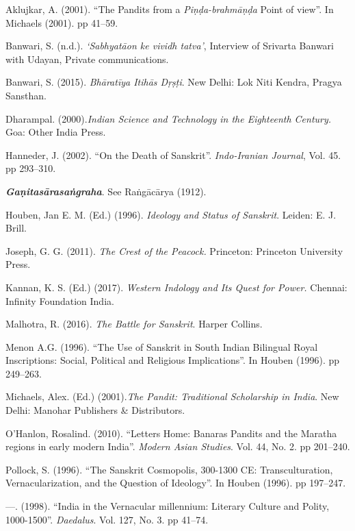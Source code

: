 \begin{thebibliography}{99}
\itemsep=1pt
 Aklujkar, A. (2001). “The Pandits from a \textit{Piṇḍa-brahmāṇḍa} Point of view”. In Michaels (2001). pp 41--59.

  Banwari, S. (n.d.). \textit{‘Sabhyatāon ke vividh tatva’}, Interview of Srivarta Banwari with Udayan, Private communications.

  Banwari, S. (2015). \textit{Bhāratīya Itihās Dṛṣṭi}. New Delhi: Lok Niti Kendra, Pragya Sansthan.

  Dharampal. (2000).\textit{Indian Science and Technology in the Eighteenth Century.} Goa: Other India Press.

  Hanneder, J. (2002). “On the Death of Sanskrit”. \textit{Indo-Iranian Journal}, Vol. 45. pp 293--310.
 
  \textbf{\textit{Gaṇitasārasaṅgraha}}. See Raṅgācārya (1912).

  Houben, Jan E. M. (Ed.) (1996). \textit{Ideology and Status of Sanskrit}. Leiden: E. J. Brill.

  Joseph, G. G. (2011). \textit{The Crest of the Peacock.} Princeton: Princeton University Press.

  Kannan, K. S. (Ed.) (2017). \textit{Western Indology and Its Quest for Power.} Chennai: Infinity Foundation India.

  Malhotra, R. (2016). \textit{The Battle for Sanskrit}. Harper Collins.

  Menon A.G. (1996). “The Use of Sanskrit in South Indian Bilingual Royal Inscriptions: Social, Political and Religious Implications”. In Houben (1996). pp 249--263.

  Michaels, Alex. (Ed.) (2001).\textit{The Pandit: Traditional Scholarship in India}. New Delhi: Manohar Publishers \& Distributors.

  O’Hanlon, Rosalind. (2010). “Letters Home: Banaras Pandits and the Maratha regions in early modern India”. \textit{Modern Asian Studies}. Vol. 44, No. 2. pp 201--240.

  Pollock, S. (1996). “The Sanskrit Cosmopolis, 300-1300 CE: Transculturation, Vernacularization, and the Question of Ideology”. In Houben (1996). pp 197--247.

  —. (1998). “India in the Vernacular millennium: Literary Culture and Polity, 1000-1500”. \textit{Daedalus}. Vol. 127, No. 3. pp 41--74.


\end{thebibliography}
